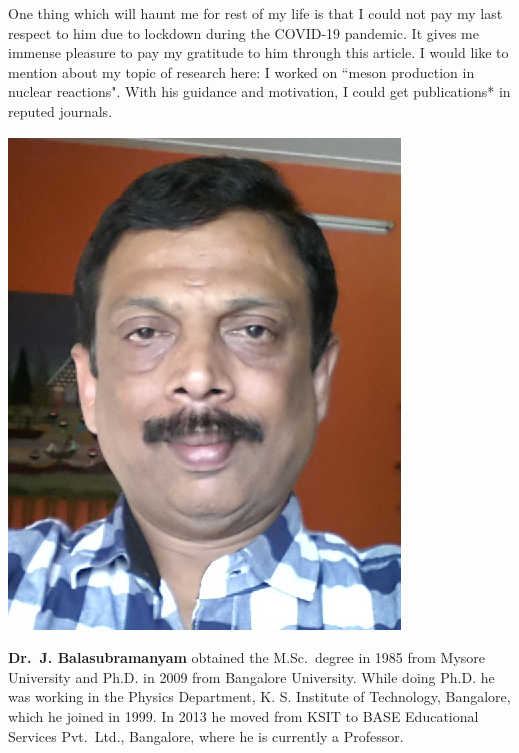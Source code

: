 One thing which will haunt me for rest of my life is that I could not pay my last respect to him due to lockdown during the COVID-19 pandemic. It gives me immense pleasure to pay my gratitude to him through this article. I would like to mention about my topic of research here: I worked on ``meson production in nuclear reactions". With his guidance and motivation, I could get publications* in reputed journals. 
\vskip 1cm

\drawline
\bigskip
\bigskip

\centerline{\includegraphics[scale=0.8]{authorsphotos/J_Balasubramanyam.eps}}
\medskip

\noindent
{\biofntsize\textbf{Dr.\ J. Balasubramanyam} obtained the M.Sc.\ degree in 1985 from Mysore University and Ph.D. in 2009 from Bangalore University. While doing Ph.D. he was working in the Physics Department, K. S. Institute of Technology, Bangalore, which he joined in 1999. In 2013 he moved from KSIT to BASE Educational Services Pvt.\ Ltd., Bangalore, where he is currently a Professor.}

